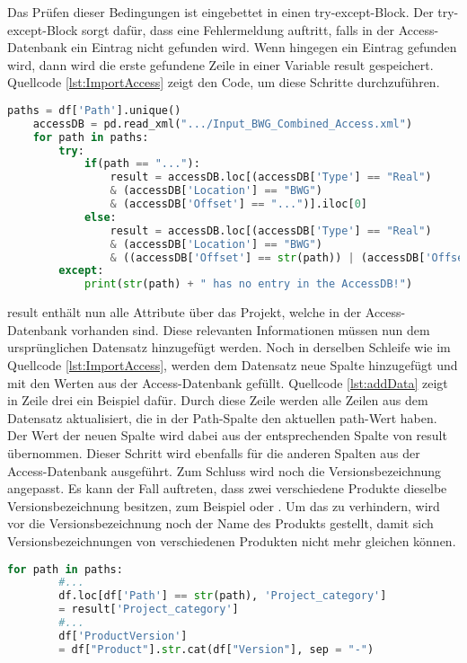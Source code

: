 Das Prüfen dieser Bedingungen ist eingebettet in einen try-except-Block. Der try-except-Block sorgt dafür, dass eine Fehlermeldung auftritt, falls in der Access-Datenbank ein Eintrag nicht gefunden wird.
Wenn hingegen ein Eintrag gefunden wird, dann wird die erste gefundene Zeile in einer Variable \glqq result\grqq{} gespeichert. Quellcode \ref*{lst:ImportAccess} zeigt den Code, um diese Schritte durchzuführen.
\begin{lstlisting}[language = python, caption={Importieren der Access-Datenbank},captionpos=b, label = lst:ImportAccess, floatplacement=H]
    paths = df['Path'].unique()
    accessDB = pd.read_xml(".../Input_BWG_Combined_Access.xml")
    for path in paths:
        try:
            if(path == "..."):
                result = accessDB.loc[(accessDB['Type'] == "Real") 
                & (accessDB['Location'] == "BWG") 
                & (accessDB['Offset'] == "...")].iloc[0]
            else:
                result = accessDB.loc[(accessDB['Type'] == "Real") 
                & (accessDB['Location'] == "BWG") 
                & ((accessDB['Offset'] == str(path)) | (accessDB['Offset'] == (str(path) + "/")))].iloc[0]           
        except:
            print(str(path) + " has no entry in the AccessDB!")
\end{lstlisting}
\glqq result\grqq{} enthält nun alle Attribute über das Projekt, welche in der Access-Datenbank vorhanden sind. Diese relevanten Informationen müssen nun dem ursprünglichen 
Datensatz hinzugefügt werden. Noch in derselben Schleife wie im Quellcode \ref*{lst:ImportAccess}, werden dem Datensatz neue Spalte hinzugefügt und mit den Werten aus der 
Access-Datenbank gefüllt. Quellcode \ref*{lst:addData} zeigt in Zeile drei ein Beispiel dafür. Durch diese Zeile werden alle Zeilen aus dem Datensatz aktualisiert, 
die in der \glqq Path\grqq{}-Spalte den aktuellen \glqq path\grqq{}-Wert haben. Der Wert der neuen Spalte wird dabei aus der entsprechenden Spalte von \glqq result\grqq{} übernommen.
Dieser Schritt wird ebenfalls für die anderen Spalten aus der Access-Datenbank ausgeführt. Zum Schluss wird noch die Versionsbezeichnung angepasst. 
Es kann der Fall auftreten, dass zwei verschiedene Produkte dieselbe Versionsbezeichnung besitzen, zum Beispiel \grqq{} oder \grqq{}. Um das zu verhindern,
wird vor die Versionsbezeichnung noch der Name des Produkts gestellt, damit sich Versionsbezeichnungen von verschiedenen Produkten nicht mehr gleichen können.
\begin{lstlisting}[language = python, caption={Erweiterung des Datensatzes},captionpos=b, label = lst:addData, floatplacement=H]
    for path in paths:
        #...
        df.loc[df['Path'] == str(path), 'Project_category']
        = result['Project_category']
        #...
        df['ProductVersion'] 
        = df["Product"].str.cat(df["Version"], sep = "-")
\end{lstlisting}
